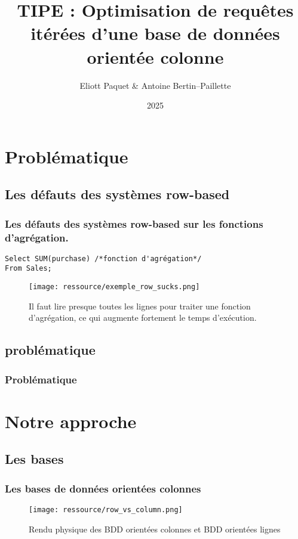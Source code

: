 \documentclass[a4paper,12pt]{beamer}
\title{TIPE : Optimisation de requêtes itérées d'une base de données orientée colonne}
\author[Eliott P \& Antoine BP]{Eliott Paquet \& Antoine Bertin--Paillette}
\date{2025}
\begin{document}
\begin{frame}
	\titlepage
\end{frame}

\section{Problématique}
\subsection{Les défauts des systèmes row-based}
\begin{frame}[containsverbatim]
	\frametitle{Les défauts des systèmes row-based sur les fonctions d'agrégation.}
	\begin{lstlisting}
Select SUM(purchase) /*fonction d'agrégation*/
From Sales;
\end{lstlisting}
	\begin{figure}[h]
		\centering
		\texttt{[image: ressource/exemple\_row\_sucks.png]}
		\caption{\small Il faut lire presque toutes les lignes pour traiter une fonction d'agrégation, ce qui augmente fortement le temps d'exécution.}
	\end{figure}

\end{frame}
\subsection{problématique}



\begin{frame}[containsverbatim] %
	\frametitle{Problématique}
	\centering




\end{frame}


\section{Notre approche}
\subsection{Les bases}
\begin{frame}
	\frametitle{Les bases de données orientées colonnes}
	\begin{figure}[h]
		\centering
		\texttt{[image: ressource/row\_vs\_column.png]}
		\caption{Rendu physique des BDD orientées colonnes et BDD orientées lignes}
	\end{figure}
\end{frame}
\end{document}
